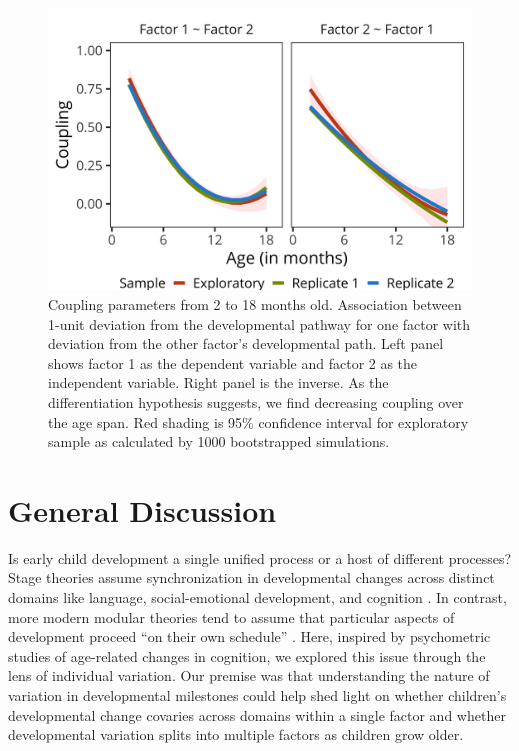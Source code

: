 \documentclass[man, floatsintext]{apa7}
\begin{document}
\begin{figure}
\centering
\includegraphics[width=.75\columnwidth]{figures/study2results.png}
\caption{Coupling parameters from 2 to 18 months old. Association between 1-unit deviation from the developmental pathway for one factor with deviation from the other factor’s developmental path. Left panel shows factor 1 as the dependent variable and factor 2 as the independent variable. Right panel is the inverse. As the differentiation hypothesis suggests, we find decreasing coupling over the age span. Red shading is 95\% confidence interval for exploratory sample as calculated by 1000 bootstrapped simulations.}
\label{fig:study2results}
\end{figure}

\section{General Discussion}\label{discussion}

Is early child development a single uniﬁed process or a host of different
processes? Stage theories assume synchronization in developmental
changes across distinct domains like language, social-emotional
development, and cognition \parencite{flavell1963}. In contrast, more modern modular theories
tend to assume that particular aspects of development proceed ``on their
own schedule'' \parencite{spelke1992,sheldrick2019}. Here, inspired by psychometric studies of
age-related changes in cognition, we explored this issue through the lens of individual variation. Our premise was that
understanding the nature of variation in developmental milestones could help shed
light on whether children's developmental change covaries across domains
within a single factor and whether developmental variation splits into multiple factors as children grow older.
\end{document}
